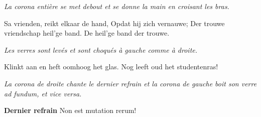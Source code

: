 \emph{La corona entière se met debout et se donne la main en croisant les bras.}

\beginverse
Sa vrienden, reikt elkaar de hand,
Opdat hij zich vernauwe;
Der trouwe vriendschap heil'ge band.
De heil'ge band der trouwe.

\emph{Les verres sont levés et sont choqués à gauche comme à droite.}

Klinkt aan en heft oomhoog het glas.
Nog leeft oud het studentenras!
\endverse

\emph{La corona de droite chante le dernier refrain et la corona de gauche boit son verre ad fundum, et vice versa.}

\beginchorus
\textbf{Dernier refrain}
{Non est mutation rerum!}
\endchorus
\endsong